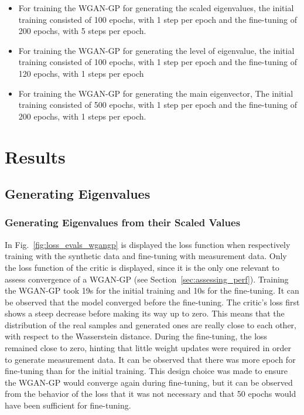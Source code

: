 \documentclass[11pt,a4paper,twoside]{report}
\begin{document}
\begin{itemize}
    \item For training the WGAN-GP for generating the scaled eigenvalues, the initial training consisted of 100 epochs, with 1 step per epoch and the fine-tuning of 200 epochs, with 5 steps per epoch.
    \item For training the WGAN-GP for generating the level of eigenvalue, the initial training consisted of 100 epochs, with 1 step per epoch and the fine-tuning of 120 epochs, with 1 steps per epoch
    \item For training the WGAN-GP for generating the main eigenvector, The initial training consisted of 500 epochs, with 1 step per epoch and the fine-tuning of 200 epochs, with 1 steps per epoch.
\end{itemize}

\chapter{Results}

\section{Generating Eigenvalues} 

\subsection{Generating Eigenvalues from their Scaled Values}

In Fig.~\ref{fig:loss_evals_wgangp}  is displayed the loss function when respectively training with the synthetic data and fine-tuning with measurement data. Only the loss function of the critic is displayed, since it is the only one relevant to assess convergence of a WGAN-GP (see Section~\ref{sec:assessing_perf}). Training the WGAN-GP took 19s for the initial training and 10s for the fine-tuning. It can be observed that the model converged before the fine-tuning. The critic's loss first shows a steep decrease before making its way up to zero. This means that the distribution of the real samples and generated ones are really close to each other, with respect to the Wasserstein distance. During the fine-tuning, the loss remained close to zero, hinting that little weight updates were required in order to generate measurement data. It can be observed that there was more epoch for fine-tuning than for the initial training. This design choice was made to ensure the WGAN-GP would converge again during fine-tuning, but it can be observed from the behavior of the loss that it was not necessary and that 50 epochs would have been sufficient for fine-tuning.    
\end{document}
